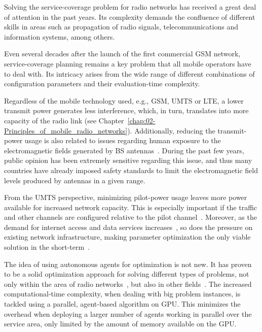 Solving the service-coverage problem for radio networks has received
a great deal of attention in the past years. Its complexity demands
the confluence of different skills in areas such as propagation of
radio signals, telecommunications and information systems, among others.

Even several decades after the launch of the first commercial GSM
network, service-coverage planning remains a key problem that all
mobile operators have to deal with. Its intricacy arises from the
wide range of different combinations of configuration parameters and
their evaluation-time complexity.

Regardless of the mobile technology used, e.g., GSM, UMTS or LTE,
a lower transmit power generates less interference, which, in turn,
translates into more capacity of the radio link (see Chapter~\ref{chap:02-Principles_of_mobile_radio_networks}).
Additionally, reducing the transmit-power usage is also related to
issues regarding human exposure to the electromagnetic fields generated
by BS antennas~\cite{Esposito_Genetic.optimization.for.optimum.3G.network.planning:2010}.
During the past few years, public opinion has been extremely sensitive
regarding this issue, and thus many countries have already imposed
safety standards to limit the electromagnetic field levels produced
by antennas in a given range.

From the UMTS perspective, minimizing pilot-power usage leaves more
power available for increased network capacity. This is especially
important if the traffic and other channels are configured relative
to the pilot channel~\cite{WCDMAforUMTS_RadioAccessForThirdGenerationMobileCommunications}.
Moreover, as the demand for internet access and data services increases~\cite{Cunningham_Network.growth.theory.and.evidence:2010},
so does the pressure on existing network infrastructure, making parameter
optimization the only viable solution in the short-term~\cite{Nawrocki-Understanding_UMTS_radio_network_modelling_and_optimisation:2006}.

\bigskip{}


The idea of using autonomous agents for optimization is not new. It
has proven to be a solid optimization approach for solving different
types of problems, not only within the area of radio networks~\cite{Cheung_Realtime.video.using.agent.over.3G.networks:2005,Esposito_Genetic.optimization.for.optimum.3G.network.planning:2010},
but also in other fields~\cite{Valcarce_Applying.FDTD.to.the.coverage.prediction.of.WiMAX:2009,Vasile_Hybrid.multiagent.approach.for.optimization:2009}.
The increased computational-time complexity, when dealing with big
problem instances, is tackled using a parallel, agent-based algorithm
on GPU. This minimizes the overhead when deploying a larger number
of agents working in parallel over the service area, only limited
by the amount of memory available on the GPU.



